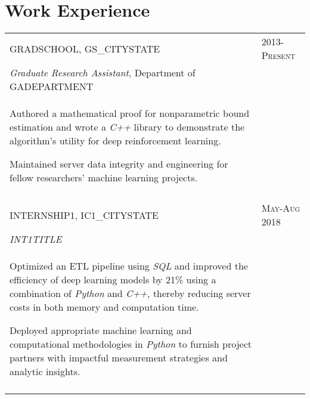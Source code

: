 \documentclass[a4paper,10pt]{article}
\begin{document}
\section{Work Experience}
\begin{supertabular}{p{13.9cm}>{\raggedleft\arraybackslash}p{3.4cm}}
	\textsc{GRADSCHOOL}, GS_CITYSTATE
	& \textsc{2013-Present} \\

	\small	\emph{Graduate Research Assistant}, \small Department of GADEPARTMENT & \\
	\begin{enumerate*}[label =$\circ$,itemjoin={\newline}]
		\item \footnotesize Authored a mathematical proof for nonparametric bound estimation and wrote a \emph{C++} library to demonstrate the algorithm's utility for deep reinforcement learning.
		\item \footnotesize Maintained server data integrity and engineering for fellow researchers' machine learning projects.
	\end{enumerate*} & \\


	 \\

	\textsc{INTERNSHIP1}, IC1_CITYSTATE
	& \textsc{May-Aug 2018} \\
	\small	\emph{INT1TITLE} & \\
	\begin{enumerate*}[label =$\circ$, itemjoin={\newline}]
		\item \footnotesize Optimized an ETL pipeline using \emph{SQL} and improved the efficiency of deep learning models by 21\% using a combination of \emph{Python} and \emph{C++}, thereby reducing server costs in both memory and computation time.
		\item \footnotesize Deployed appropriate machine learning and computational methodologies in \emph{Python} to furnish project partners with impactful measurement strategies and analytic insights.
	\end{enumerate*} & \\
	 \\





\end{supertabular}
\end{document}
